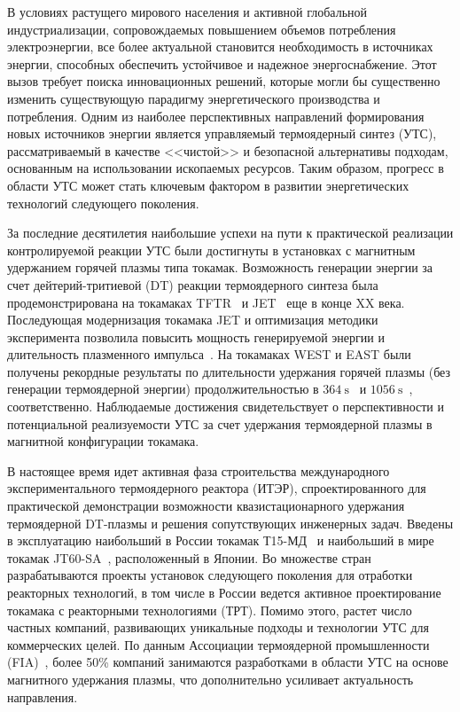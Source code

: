 
{\actuality} В условиях растущего мирового населения и активной глобальной индустриализации, сопровождаемых повышением объемов потребления электроэнергии, 
все более актуальной становится необходимость в источниках энергии, способных обеспечить устойчивое и надежное энергоснабжение. Этот вызов требует поиска инновационных решений, которые могли бы существенно изменить существующую парадигму энергетического производства и потребления. Одним из наиболее перспективных направлений формирования новых источников энергии является управляемый термоядерный синтез (УТС), рассматриваемый в качестве <<чистой>> и безопасной альтернативы подходам, основанным на использовании ископаемых ресурсов. Таким образом, прогресс в области УТС может стать ключевым фактором в развитии энергетических технологий следующего поколения.  

За последние десятилетия наибольшие успехи на пути к практической реализации контролируемой реакции УТС были достигнуты в установках с магнитным удержанием горячей плазмы типа токамак. Возможность генерации энергии за счет дейтерий-тритиевой (DT) реакции термоядерного синтеза была продемонстрирована на токамаках TFTR~\cite{Skinner1997} и JET~\cite{Keilhacker1999} еще в конце XX века. Последующая модернизация токамака JET и оптимизация методики эксперимента позволила повысить мощность генерируемой энергии и длительность плазменного импульса~\cite{Maggi2024,Kappatou2025}. На токамаках WEST и EAST были получены рекордные результаты по длительности удержания горячей плазмы (без генерации термоядерной энергии) продолжительностью в \(\SI{364}{\second}\)~\cite{Shi2025} и \(\SI{1056}{\second}\)~\cite{Song2024}, соответственно. Наблюдаемые достижения свидетельствует о перспективности и потенциальной реализуемости УТС за счет удержания термоядерной плазмы в магнитной конфигурации токамака.

В настоящее время идет активная фаза строительства международного экспериментального термоядерного реактора (ИТЭР), спроектированного для практической демонстрации возможности квазистационарного удержания термоядерной DT-плазмы и решения сопутствующих инженерных задач. Введены в эксплуатацию наибольший в России токамак Т15-МД~\cite{Velikhov2024} и наибольший в мире токамак JT60-SA~\cite{Shirai2024}, расположенный в Японии. Во множестве стран разрабатываются проекты установок следующего поколения для отработки реакторных технологий, в том числе в России ведется активное проектирование токамака с реакторными технологиями (ТРТ). Помимо этого, растет число частных компаний, развивающих уникальные подходы и технологии УТС для коммерческих целей. По данным Ассоциации термоядерной промышленности (FIA)~\cite{FIA}, более 50\% компаний занимаются разработками в области УТС на основе магнитного удержания плазмы, что дополнительно усиливает актуальность направления. 


